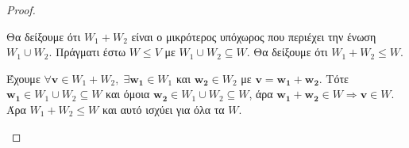 \begin{proof}
\begin{myitemize}
    \item Θα δείξουμε ότι $ W_{1}+W_{2} $ είναι ο μικρότερος υπόχωρος που περιέχει 
        την ένωση $ W_{1} \cup W_{2} $. Πράγματι
        έστω $ W \leq V $ με $ W_{1} \cup W_{2} \subseteq W $. Θα δείξουμε ότι 
        $ W_{1}+W_{2} \leq W $.

        Έχουμε $ \forall \mathbf{v} \in W_{1} + W_{2}, \; \exists \mathbf{w_{1}} 
        \in W_{1}  $ και $ \mathbf{w_{2}} \in W_{2} $ με $ \mathbf{v} = 
        \mathbf{w_{1}}+ \mathbf{w_{2}} $.  Τότε $ \mathbf{w_{1}} \in W_{1} \cup W_{2} 
        \subseteq W $
        και όμοια $ \mathbf{w_{2}} \in W_{1} \cup W_{2} \subseteq W $, άρα 
        $ \mathbf{w_{1}}+ \mathbf{w_{2}} \in W \Rightarrow \mathbf{v} \in W $. 
        Άρα $ W_{1}+W_{2} \leq W $ 
        και αυτό ισχύει για όλα τα $W$. 
    \end{myitemize}
\end{proof} 

